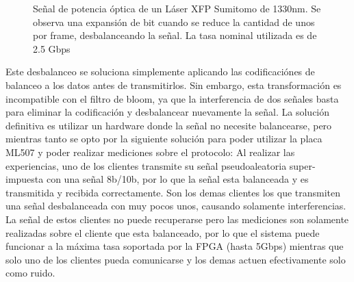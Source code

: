 \begin{figure}[!t]
   \centering
   \qquad
   \qquad
  \caption {Señal de potencia óptica de un Láser XFP Sumitomo de 1330nm. Se observa una expansión de bit cuando se reduce la cantidad de unos por frame, desbalanceando la señal. La tasa nominal utilizada es de 2.5 Gbps}
  \label{fig:ImgExpansion}
\end{figure}

Este desbalanceo se soluciona simplemente aplicando las codificaciónes de balanceo a los datos antes de transmitirlos. Sin embargo, esta transformación es incompatible con el filtro de bloom, ya que la interferencia de dos señales basta para eliminar la codificación y desbalancear nuevamente la señal. La solución definitiva es utilizar un hardware donde la señal no necesite balancearse, pero mientras tanto se opto por la siguiente solución para poder utilizar la placa ML507 y poder realizar mediciones sobre el protocolo: Al realizar las experiencias, uno de los clientes transmite su señal pseudoaleatoria super-impuesta con una señal 8b/10b, por lo que la señal esta balanceada y es transmitida y recibida correctamente. Son los demas clientes los que transmiten una señal desbalanceada con muy pocos unos, causando solamente interferencias. La señal de estos clientes no puede recuperarse pero las mediciones son solamente realizadas sobre el cliente que esta balanceado, por lo que el sistema puede funcionar a la máxima tasa soportada por la FPGA (hasta 5Gbps) mientras que solo uno de los clientes pueda comunicarse y los demas actuen efectivamente solo como ruido.

